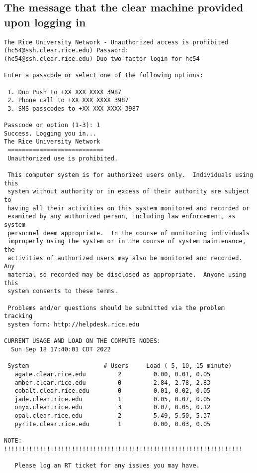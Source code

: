 \documentclass[10pt,a4paper]{article}
\begin{document}
\subsection{The message that the clear machine provided upon logging in}
\begin{verbatim}
The Rice University Network - Unauthorized access is prohibited
(hc54@ssh.clear.rice.edu) Password: 
(hc54@ssh.clear.rice.edu) Duo two-factor login for hc54

Enter a passcode or select one of the following options:

 1. Duo Push to +XX XXX XXXX 3987
 2. Phone call to +XX XXX XXXX 3987
 3. SMS passcodes to +XX XXX XXXX 3987

Passcode or option (1-3): 1
Success. Logging you in...
The Rice University Network
 ===========================
 Unauthorized use is prohibited.
 
 This computer system is for authorized users only.  Individuals using this
 system without authority or in excess of their authority are subject to
 having all their activities on this system monitored and recorded or
 examined by any authorized person, including law enforcement, as system
 personnel deem appropriate.  In the course of monitoring individuals
 improperly using the system or in the course of system maintenance, the
 activities of authorized users may also be monitored and recorded.  Any
 material so recorded may be disclosed as appropriate.  Anyone using this
 system consents to these terms.
 
 Problems and/or questions should be submitted via the problem tracking
 system form: http://helpdesk.rice.edu
 
CURRENT USAGE AND LOAD ON THE COMPUTE NODES:
  Sun Sep 18 17:40:01 CDT 2022

 System                   	# Users   	Load ( 5, 10, 15 minute)      
   agate.clear.rice.edu   	    2     	  0.00, 0.01, 0.05            
   amber.clear.rice.edu   	    0     	  2.84, 2.78, 2.83            
   cobalt.clear.rice.edu  	    0     	  0.01, 0.02, 0.05            
   jade.clear.rice.edu    	    1     	  0.05, 0.07, 0.05            
   onyx.clear.rice.edu    	    3     	  0.07, 0.05, 0.12            
   opal.clear.rice.edu    	    2     	  5.49, 5.50, 5.37            
   pyrite.clear.rice.edu  	    1     	  0.00, 0.03, 0.05            

NOTE: !!!!!!!!!!!!!!!!!!!!!!!!!!!!!!!!!!!!!!!!!!!!!!!!!!!!!!!!!!!!!!!!!!!
 
   Please log an RT ticket for any issues you may have.
 

\end{verbatim}
\end{document}
